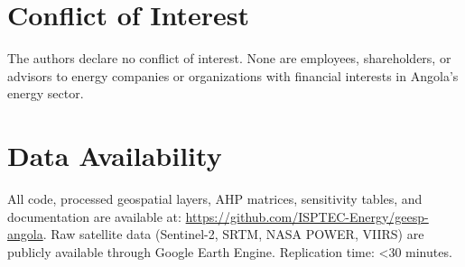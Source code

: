 \documentclass[12pt, a4paper]{article}
\begin{document}
\section*{Conflict of Interest}
The authors declare no conflict of interest. None are employees, shareholders, or advisors to energy companies or organizations with financial interests in Angola's energy sector.

\section*{Data Availability}
All code, processed geospatial layers, AHP matrices, sensitivity tables, and documentation are available at: \url{https://github.com/ISPTEC-Energy/geesp-angola}. Raw satellite data (Sentinel-2, SRTM, NASA POWER, VIIRS) are publicly available through Google Earth Engine. Replication time: <30 minutes.
\end{document}
